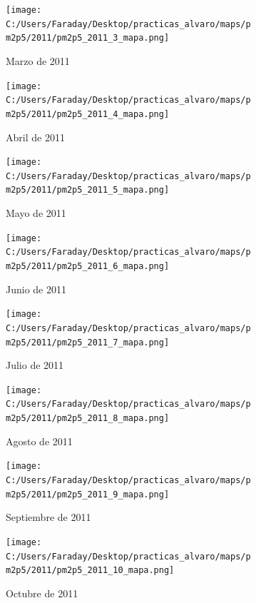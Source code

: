 \documentclass[12pt]{article}
\begin{document}
\begin{figure}[H]
\centering
\begin{subfigure}[h]{0.45\textwidth}
\texttt{[image: C:/Users/Faraday/Desktop/practicas\_alvaro/maps/pm2p5/2011/pm2p5\_2011\_3\_mapa.png]}
\caption{Marzo de 2011}
\label{fig:map-mon-4-3-2011}
\end{subfigure}
%
\begin{subfigure}[H]{0.45\textwidth}
\texttt{[image: C:/Users/Faraday/Desktop/practicas\_alvaro/maps/pm2p5/2011/pm2p5\_2011\_4\_mapa.png]}
\caption{Abril de 2011}
\label{fig:map-mon-4-4-2011}
\end{subfigure}
\caption{}
\end{figure}

\begin{figure}[H]
\centering
\begin{subfigure}[h]{0.45\textwidth}
\texttt{[image: C:/Users/Faraday/Desktop/practicas\_alvaro/maps/pm2p5/2011/pm2p5\_2011\_5\_mapa.png]}
\caption{Mayo de 2011}
\label{fig:map-mon-4-5-2011}
\end{subfigure}
%
\begin{subfigure}[H]{0.45\textwidth}
\texttt{[image: C:/Users/Faraday/Desktop/practicas\_alvaro/maps/pm2p5/2011/pm2p5\_2011\_6\_mapa.png]}
\caption{Junio de 2011}
\label{fig:map-mon-4-6-2011}
\end{subfigure}
\caption{}
\end{figure}

\newpage

\begin{figure}[H]
\centering
\begin{subfigure}[h]{0.45\textwidth}
\texttt{[image: C:/Users/Faraday/Desktop/practicas\_alvaro/maps/pm2p5/2011/pm2p5\_2011\_7\_mapa.png]}
\caption{Julio de 2011}
\label{fig:map-mon-4-7-2011}
\end{subfigure}
%
\begin{subfigure}[H]{0.45\textwidth}
\texttt{[image: C:/Users/Faraday/Desktop/practicas\_alvaro/maps/pm2p5/2011/pm2p5\_2011\_8\_mapa.png]}
\caption{Agosto de 2011}
\label{fig:map-mon-4-8-2011}
\end{subfigure}
\caption{}
\end{figure}

\begin{figure}[H]
\centering
\begin{subfigure}[h]{0.45\textwidth}
\texttt{[image: C:/Users/Faraday/Desktop/practicas\_alvaro/maps/pm2p5/2011/pm2p5\_2011\_9\_mapa.png]}
\caption{Septiembre de 2011}
\label{fig:map-mon-4-9-2011}
\end{subfigure}
%
\begin{subfigure}[H]{0.45\textwidth}
\texttt{[image: C:/Users/Faraday/Desktop/practicas\_alvaro/maps/pm2p5/2011/pm2p5\_2011\_10\_mapa.png]}
\caption{Octubre de 2011}
\label{fig:map-mon-4-10-2011}
\end{subfigure}
\caption{}
\end{figure}
\end{document}
